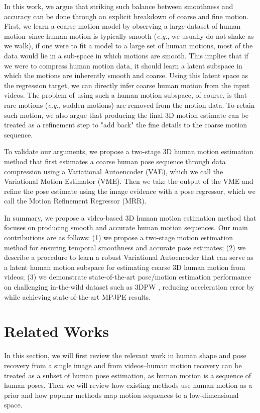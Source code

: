 \documentclass[runningheads]{llncs}
\begin{document}
In this work, we argue that striking such balance between smoothness and accuracy can be done through an explicit breakdown of coarse and fine motion. First, we learn a coarse motion model by observing a large dataset of human motion--since human motion is typically smooth (\emph{e.g.}, we usually do not shake as we walk), if one were to fit a model to a large set of human motions, most of the data would lie in a sub-space in which motions are smooth. This implies that if we were to compress human motion data, it should learn a latent subspace in which the motions are inherently smooth and coarse. Using this latent space as the regression target, we can directly infer coarse human motion from the input videos. The problem of using such a human motion subspace, of course, is that rare motions (\emph{e.g.,} sudden motions) are removed from the motion data. To retain such motion, we also argue that producing the final 3D motion estimate can be treated as a refinement step to "add back" the fine details to the coarse motion sequence. 

To validate our arguments, we propose a two-stage 3D human motion estimation method that first estimates a coarse human pose sequence through data compression using a Variational Autoencoder (VAE), which we call the Variational Motion Estimator (VME). Then we take the output of the VME and refine the pose estimate using the image evidence with a pose regressor, which we call the Motion Refinement Regressor (MRR).

In summary, we propose a video-based 3D human motion estimation method that focuses on producing smooth and accurate human motion sequences. Our main contributions are as follows: (1) we propose a two-stage motion estimation method for ensuring temporal smoothness and accurate pose estimates; (2) we describe a procedure to learn a robust Variational Autoencoder that can serve as a latent human motion subspace for estimating coarse 3D human motion from videos; (3) we demonstrate state-of-the-art pose/motion estimation performance on challenging in-the-wild dataset such as 3DPW \cite{3dpw}, reducing acceleration error by  while achieving state-of-the-art MPJPE results.


\section{Related Works}
\label{Related}
In this section, we will first review the relevant work in human shape and pose recovery from a single image and from videos--human motion recovery can be treated as a subset of human pose estimation, as human motion is a sequence of human poses. Then we will review how existing methods use human motion as a prior and how popular methods map motion sequences to a low-dimensional space. 
\end{document}
